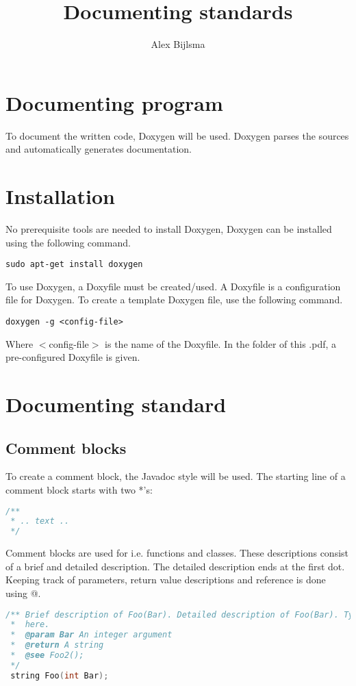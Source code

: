 \documentclass{article}
\title{Documenting standards}
\author{Alex Bijlsma}
\begin{document}
	
\maketitle

\section{Documenting program}
To document the written code, Doxygen will be used. Doxygen parses the sources and automatically generates documentation.

\section{Installation}
No prerequisite tools are needed to install Doxygen, Doxygen can be installed using the following command.\newline

\texttt{sudo apt-get install doxygen} \newline

To use Doxygen, a Doxyfile must be created/used. A Doxyfile is a configuration file for Doxygen.
To create a template Doxygen file, use the following command.\newline

\texttt{doxygen -g <config-file>}\newline

Where $<$config-file$>$ is the name of the Doxyfile.
In the folder of this .pdf, a pre-configured Doxyfile is given.
\section{Documenting standard}
\subsection{Comment blocks}
To create a comment block, the Javadoc style will be used. The starting line of a comment block starts with two *'s:

\begin{lstlisting}[language=cpp]
/**
 * .. text ..
 */
\end{lstlisting}

Comment blocks are used for i.e. functions and classes. These descriptions consist of a brief and detailed description. The detailed description ends at the first dot.
Keeping track of parameters, return value descriptions and reference is done using @.

\begin{lstlisting}[language=cpp]
/** Brief description of Foo(Bar). Detailed description of Foo(Bar). Type as much as you'd like
 *  here.
 *  @param Bar An integer argument
 *  @return A string
 *  @see Foo2();
 */
 string Foo(int Bar);
\end{lstlisting}
\end{document}
